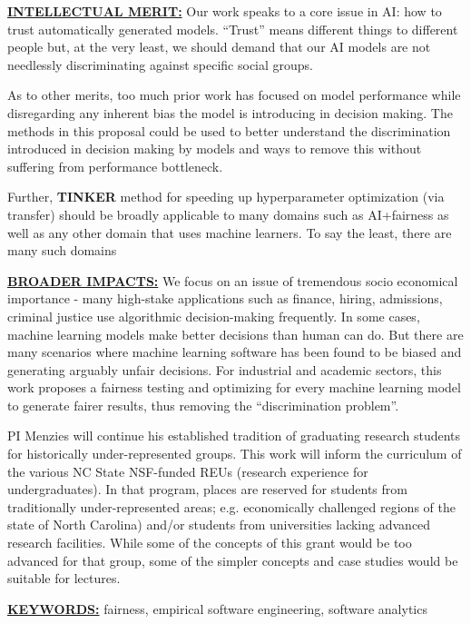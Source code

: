 \documentclass{NSF}
\newcommand{\IT}{{\bf {\sffamily TINKER}}}
\newcommand{\IT}{{\bf {\sffamily TINKER}}}
\begin{document}
\begin{nsfsummary}
\vspace{2mm}
 \noindent
\underline{{\bf INTELLECTUAL MERIT:}} 
Our work speaks to a core issue in AI: how to trust automatically generated models.
``Trust'' means   different things to different people but, at the very least, we should
demand that  our AI models are not needlessly discriminating against specific social groups.

As to other merits,  too much prior work has focused on  model  performance 
while disregarding any inherent bias the model is introducing in decision making. The methods in this proposal could be used to better understand the discrimination introduced in decision making by models and ways to remove this without suffering from performance bottleneck.

Further, {\IT} method for speeding up hyperparameter optimization (via transfer) should
be broadly applicable to many domains such as AI+fairness as well as any other domain that uses
machine learners. To say the least, there are many such domains
 
 
\vspace{2mm}
\noindent
\underline{{\bf BROADER IMPACTS:}}
We focus on an issue of tremendous socio economical importance - many high-stake applications such as finance, hiring, admissions, criminal justice use algorithmic decision-making frequently. In some cases, machine learning models make better decisions than human can do. But there are many scenarios where machine learning software has been found to be biased and generating arguably unfair decisions. For industrial and academic sectors, this work proposes a fairness testing and optimizing for every machine learning model to generate fairer results, thus removing the ``discrimination problem''.

PI Menzies will continue his established tradition of graduating research students for historically under-represented groups. This work will inform the curriculum of  the various NC State  NSF-funded REUs (research experience for undergraduates).
In that program, places are reserved for students from traditionally under-represented areas; e.g. economically challenged regions of the state of North Carolina) and/or students from universities lacking advanced research facilities. While some of the concepts of this grant would be too advanced for that group, some of the simpler concepts and case studies would be suitable for lectures.

\vspace{2mm}
\noindent \underline{{\bf KEYWORDS:}} fairness, empirical software engineering, software analytics
\end{nsfsummary}
\end{document}

